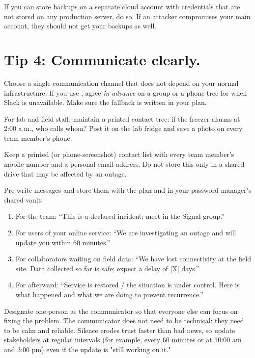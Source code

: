 \documentclass[10pt,letterpaper]{article}
\begin{document}
\begin{notebox}

If you can store backups on a separate cloud account with credentials that are
not stored on any production server, do so. If an attacker compromises your
main account, they should not get your backups as well.

\end{notebox}

\section*{Tip 4: Communicate clearly.}

Choose a single communication channel that does not depend on your normal
infrastructure. If you use , agree \emph{in
advance} on a  group or a phone tree for when Slack is
unavailable.  Make sure the fallback is written in your plan.

For lab and field staff, maintain a printed contact tree: if the freezer alarms
at 2:00 a.m., who calls whom? Post it on the lab fridge and save a photo on
every team member's phone.

Keep a printed (or phone-screenshot) contact list with every team member's
mobile number and a personal email address. Do not store this only in a shared
drive that may be affected by an outage.

Pre-write messages and store them with the plan and in your password manager's
shared vault:

\begin{enumerate}
\item
  For the team: ``This is a declared incident: meet in the Signal group.''
\item
  For users of your online service: ``We are investigating an outage and
  will update you within 60 minutes.''
\item
  For collaborators waiting on field data: ``We have lost connectivity at
  the field site. Data collected so far is safe; expect a delay of [X]
  days.''
\item
  For afterward: ``Service is restored / the situation is under control.
  Here is what happened and what we are doing to prevent recurrence.''
\end{enumerate}

Designate one person as the communicator so that everyone else can focus on
fixing the problem. The communicator does not need to be technical: they need to
be calm and reliable. Silence erodes trust faster than bad news, so update
stakeholders at regular intervals (for example, every 60 minutes or at 10:00 am
and 3:00 pm) even if the update is "still working on it."
\end{document}
